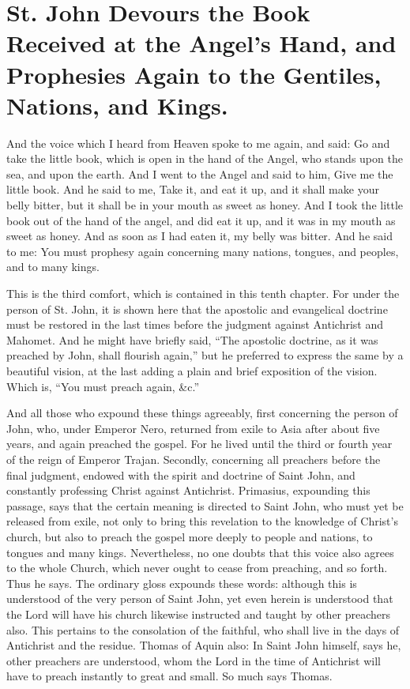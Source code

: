 \chapter[Sermon 45. St. John Devours the Book Received at the Angel's Hand, and Prophesies Again to the Gentiles, Nations, and Kings.]{St. John Devours the Book Received at the Angel's Hand, and Prophesies Again to the Gentiles, Nations, and Kings.}
\label{sermon:045}

And the voice which I heard from Heaven spoke to me again, and said: Go and take the little book, which is open in the hand of the Angel, who stands upon the sea, and upon the earth. And I went to the Angel and said to him, Give me the little book. And he said to me, Take it, and eat it up, and it shall make your belly bitter, but it shall be in your mouth as sweet as honey. And I took the little book out of the hand of the angel, and did eat it up, and it was in my mouth as sweet as honey. And as soon as I had eaten it, my belly was bitter. And he said to me: You must prophesy again concerning many nations, tongues, and peoples, and to many kings.

This is the third comfort, which is contained in this tenth chapter. For under the person of St. John, it is shown here that the apostolic and evangelical doctrine must be restored in the last times before the judgment against Antichrist and Mahomet. And he might have briefly said, “The apostolic doctrine, as it was preached by John, shall flourish again,” but he preferred to express the same by a beautiful vision, at the last adding a plain and brief exposition of the vision. Which is, “You must preach again, \&c.”

And all those who expound these things agreeably, first concerning the person of John, who, under Emperor Nero, returned from exile to Asia after about five years, and again preached the gospel. For he lived until the third or fourth year of the reign of Emperor Trajan. Secondly, concerning all preachers before the final judgment, endowed with the spirit and doctrine of Saint John, and constantly professing Christ against Antichrist. Primasius, expounding this passage, says that the certain meaning is directed to Saint John, who must yet be released from exile, not only to bring this revelation to the knowledge of Christ’s church, but also to preach the gospel more deeply to people and nations, to tongues and many kings. Nevertheless, no one doubts that this voice also agrees to the whole Church, which never ought to cease from preaching, and so forth. Thus he says. The ordinary gloss expounds these words: although this is understood of the very person of Saint John, yet even herein is understood that the Lord will have his church likewise instructed and taught by other preachers also. This pertains to the consolation of the faithful, who shall live in the days of Antichrist and the residue. Thomas of Aquin also: In Saint John himself, says he, other preachers are understood, whom the Lord in the time of Antichrist will have to preach instantly to great and small. So much says Thomas.

